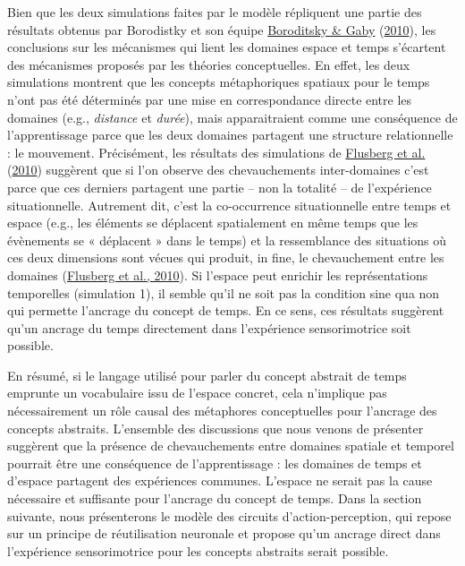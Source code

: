 \documentclass[
  a4paper,12pt,twoside,onecolumn,openright,final,oldfontcommands]{memoir}
\begin{document}
Bien que les deux simulations faites par le modèle répliquent une partie des résultats obtenus par Borodistky et son équipe \protect\hyperlink{ref-boroditsky_remembrances_2010}{Boroditsky \& Gaby} (\protect\hyperlink{ref-boroditsky_remembrances_2010}{2010}), les conclusions sur les mécanismes qui lient les domaines espace et temps s'écartent des mécanismes proposés par les théories conceptuelles. En effet, les deux simulations montrent que les concepts métaphoriques spatiaux pour le temps n'ont pas été déterminés par une mise en correspondance directe entre les domaines (e.g., \emph{distance} et \emph{durée}), mais apparaitraient comme une conséquence de l'apprentissage parce que les deux domaines partagent une structure relationnelle : le mouvement.
Précisément, les résultats des simulations de \protect\hyperlink{ref-flusberg_connectionist_2010}{Flusberg et al.} (\protect\hyperlink{ref-flusberg_connectionist_2010}{2010}) suggèrent que si l'on observe des chevauchements inter-domaines c'est parce que ces derniers partagent une partie -- non la totalité -- de l'expérience situationnelle. Autrement dit, c'est la co-occurrence situationnelle entre temps et espace (e.g., les éléments se déplacent spatialement en même temps que les évènements se « déplacent » dans le temps) et la ressemblance des situations où ces deux dimensions sont vécues qui produit, in fine, le chevauchement entre les domaines (\protect\hyperlink{ref-flusberg_connectionist_2010}{Flusberg et al., 2010}). Si l'espace peut enrichir les représentations temporelles (simulation 1), il semble qu'il ne soit pas la condition sine qua non qui permette l'ancrage du concept de temps. En ce sens, ces résultats suggèrent qu'un ancrage du temps directement dans l'expérience sensorimotrice soit possible.

En résumé, si le langage utilisé pour parler du concept abstrait de temps emprunte un vocabulaire issu de l'espace concret, cela n'implique pas nécessairement un rôle causal des métaphores conceptuelles pour l'ancrage des concepts abstraits. L'ensemble des discussions que nous venons de présenter suggèrent que la présence de chevauchements entre domaines spatiale et temporel pourrait être une conséquence de l'apprentissage : les domaines de temps et d'espace partagent des expériences communes. L'espace ne serait pas la cause nécessaire et suffisante pour l'ancrage du concept de temps. Dans la section suivante, nous présenterons le modèle des circuits d'action-perception, qui repose sur un principe de réutilisation neuronale et propose qu'un ancrage direct dans l'expérience sensorimotrice pour les concepts abstraits serait possible.
\end{document}
